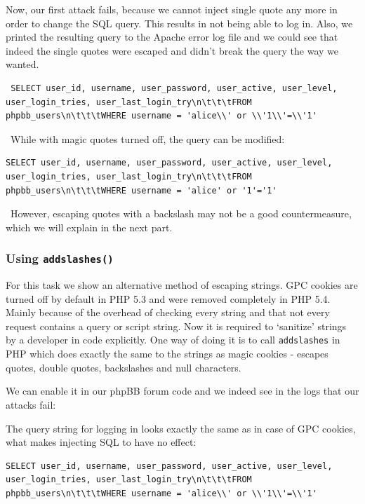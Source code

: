 \documentclass[12pt, a4paper, pdflatex]{article}
\begin{document}
Now, our first attack fails, because we cannot inject single quote any more in order to change the SQL query. This results in not being able to log in.
Also, we printed the resulting query to the Apache error log file and we could see that indeed the single quotes were escaped and didn't break the query the way we wanted.\
\lstset{
	captionpos=b,
	frame=single,
	language=SQL,
	breaklines=true,
	label=sql1
}
\begin{lstlisting}
 SELECT user_id, username, user_password, user_active, user_level, user_login_tries, user_last_login_try\n\t\t\tFROM phpbb_users\n\t\t\tWHERE username = 'alice\\' or \\'1\\'=\\'1'
\end{lstlisting}\
While with magic quotes turned off, the query can be modified:
\lstset{
	captionpos=b,
	frame=single,
	language=SQL,
	breaklines=true,
	label=sql2
}
\begin{lstlisting}
SELECT user_id, username, user_password, user_active, user_level, user_login_tries, user_last_login_try\n\t\t\tFROM phpbb_users\n\t\t\tWHERE username = 'alice' or '1'='1'
\end{lstlisting}\
However, escaping quotes with a backslash may not be a good countermeasure, which we will explain in the next part.

\subsubsection{Using \texttt{addslashes()}}

For this task we show an alternative method of escaping strings. GPC cookies are turned off by default in PHP 5.3 and were removed completely in PHP 5.4. Mainly because of the overhead of checking every string and that not every request contains a query or script string. Now it is required to `sanitize' strings by a developer in code explicitly. One way of doing it is to call
\texttt{addslashes} in PHP which does exactly the same to the strings as magic cookies - escapes quotes, double quotes, backslashes and null characters.

We can enable it in our phpBB forum code and we indeed see in the logs that our attacks fail:

The query string for logging in looks exactly the same as in case of GPC cookies, what makes injecting SQL to have no effect:

\lstset{
	captionpos=b,
	frame=single,
	language=SQL,
	breaklines=true,
	label=sqladdslash
}
\begin{lstlisting}
SELECT user_id, username, user_password, user_active, user_level, user_login_tries, user_last_login_try\n\t\t\tFROM phpbb_users\n\t\t\tWHERE username = 'alice\\' or \\'1\\'=\\'1'
\end{lstlisting}
\end{document}
